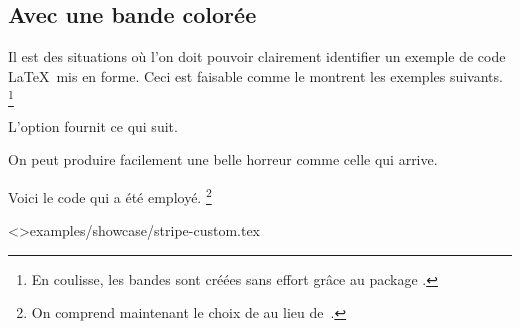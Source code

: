 \documentclass{../main/main}
\begin{document}
\subsection{Avec une bande colorée}

Il est des situations où l'on doit pouvoir clairement identifier un exemple de code \LaTeX\ mis en forme. Ceci est faisable comme le montrent les exemples suivants.%
\footnote{
    En coulisse, les bandes sont créées sans effort grâce au package .
}


\begin{tdocexa}
	L'option  fournit ce qui suit.

	
\end{tdocexa}


\begin{tdocexa}
	On peut produire facilement une belle horreur comme celle qui arrive.

	
	
	Voici le code qui a été employé.%
	\footnote{
		On comprend maintenant le choix de  au lieu de \,.
	}

	\tdoclatexinput<>{examples/showcase/stripe-custom.tex}
\end{tdocexa}
\end{document}
